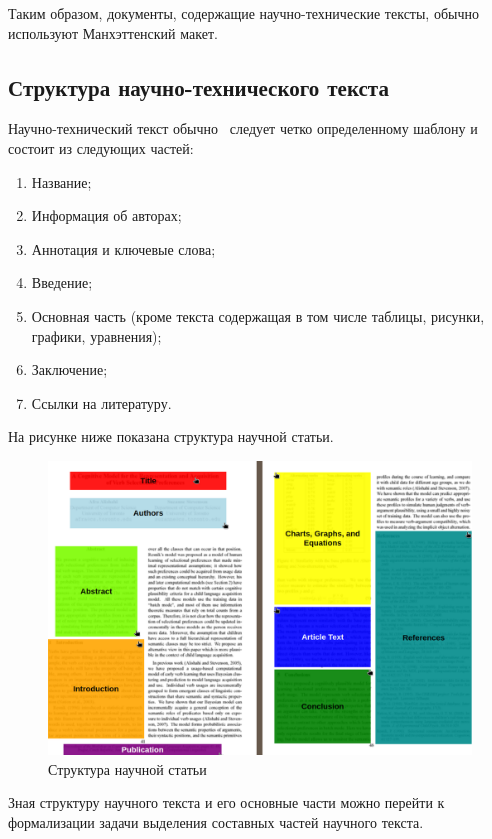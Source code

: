 Таким образом, документы, содержащие научно-технические тексты, обычно используют Манхэттенский макет.

\subsection{Структура научно-технического текста}

Научно-технический текст обычно~\cite{butenko2022, romanov2014, raitskaya2019} следует четко определенному шаблону и состоит из следующих частей:
\begin{enumerate}
    \item Название;
    \item Информация об авторах;
    \item Аннотация и ключевые слова;
    \item Введение;
    \item Основная часть (кроме текста содержащая в том числе таблицы, рисунки, графики, уравнения);
    \item Заключение;
    \item Ссылки на литературу.
\end{enumerate}

На рисунке ниже показана структура научной статьи.

\begin{figure}[H]
	\centering
	\includegraphics[width=\textwidth]{img/struct-parts-named.png}
	\caption{Структура научной статьи}
	\label{fig:}
\end{figure}

Зная структуру научного текста и его основные части можно перейти к формализации задачи выделения составных частей научного текста.

